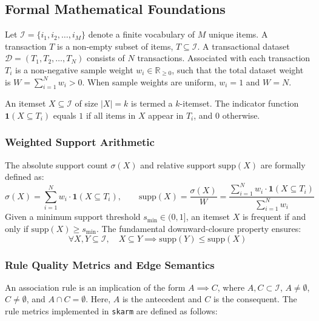 \documentclass[11pt,a4paper]{article}
\begin{document}
\subsection{Formal Mathematical Foundations}
Let $\mathcal{I} = \{i_1, i_2, \dots, i_M\}$ denote a finite vocabulary of $M$ unique items. A transaction $T$ is a non-empty subset of items, $T \subseteq \mathcal{I}$. A transactional dataset $\mathcal{D} = (T_1, T_2, \dots, T_N)$ consists of $N$ transactions. Associated with each transaction $T_i$ is a non-negative sample weight $w_i \in \mathbb{R}_{\ge 0}$, such that the total dataset weight is $W = \sum_{i=1}^N w_i > 0$. When sample weights are uniform, $w_i = 1$ and $W = N$.

An itemset $X \subseteq \mathcal{I}$ of size $|X| = k$ is termed a $k$-itemset. The indicator function $\mathbf{1}(X \subseteq T_i)$ equals $1$ if all items in $X$ appear in $T_i$, and $0$ otherwise.

\subsubsection{Weighted Support Arithmetic}
The absolute support count $\sigma(X)$ and relative support $\text{supp}(X)$ are formally defined as:
\begin{equation}
\sigma(X) = \sum_{i=1}^N w_i \cdot \mathbf{1}(X \subseteq T_i), \qquad \text{supp}(X) = \frac{\sigma(X)}{W} = \frac{\sum_{i=1}^N w_i \cdot \mathbf{1}(X \subseteq T_i)}{\sum_{i=1}^N w_i}
\end{equation}
Given a minimum support threshold $s_{\min} \in (0, 1]$, an itemset $X$ is frequent if and only if $\text{supp}(X) \ge s_{\min}$. The fundamental downward-closure property ensures:
\begin{equation}
\forall X, Y \subseteq \mathcal{I}, \quad X \subseteq Y \implies \text{supp}(Y) \le \text{supp}(X)
\end{equation}

\subsubsection{Rule Quality Metrics and Edge Semantics}
An association rule is an implication of the form $A \implies C$, where $A, C \subset \mathcal{I}$, $A \neq \emptyset$, $C \neq \emptyset$, and $A \cap C = \emptyset$. Here, $A$ is the antecedent and $C$ is the consequent. The rule metrics implemented in \texttt{skarm} are defined as follows:
\end{document}
